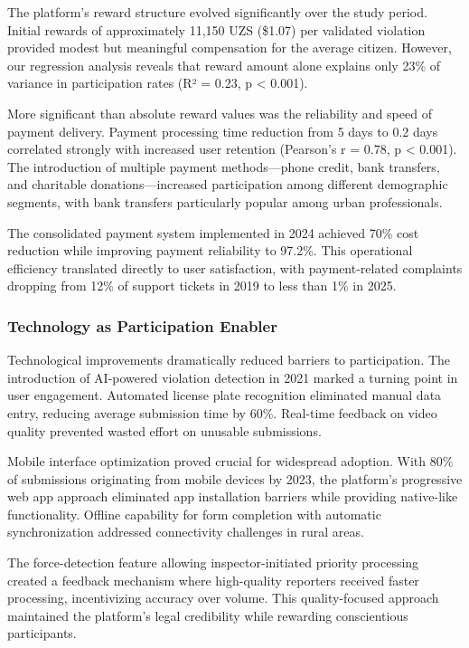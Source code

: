\documentclass[pdflatex,sn-mathphys-num]{sn-jnl}%
\theoremstyle{thmstyleone}%
\theoremstyle{thmstyletwo}%
\theoremstyle{thmstylethree}%
\begin{document}
The platform's reward structure evolved significantly over the study period. Initial rewards of approximately 11,150 UZS (\$1.07) per validated violation provided modest but meaningful compensation for the average citizen. However, our regression analysis reveals that reward amount alone explains only 23\% of variance in participation rates (R² = 0.23, p < 0.001).

More significant than absolute reward values was the reliability and speed of payment delivery. Payment processing time reduction from 5 days to 0.2 days correlated strongly with increased user retention (Pearson's r = 0.78, p < 0.001). The introduction of multiple payment methods—phone credit, bank transfers, and charitable donations—increased participation among different demographic segments, with bank transfers particularly popular among urban professionals.

The consolidated payment system implemented in 2024 achieved 70\% cost reduction while improving payment reliability to 97.2\%. This operational efficiency translated directly to user satisfaction, with payment-related complaints dropping from 12\% of support tickets in 2019 to less than 1\% in 2025.

\subsubsection{Technology as Participation Enabler}

Technological improvements dramatically reduced barriers to participation. The introduction of AI-powered violation detection in 2021 marked a turning point in user engagement. Automated license plate recognition eliminated manual data entry, reducing average submission time by 60\%. Real-time feedback on video quality prevented wasted effort on unusable submissions.

Mobile interface optimization proved crucial for widespread adoption. With 80\% of submissions originating from mobile devices by 2023, the platform's progressive web app approach eliminated app installation barriers while providing native-like functionality. Offline capability for form completion with automatic synchronization addressed connectivity challenges in rural areas.

The force-detection feature allowing inspector-initiated priority processing created a feedback mechanism where high-quality reporters received faster processing, incentivizing accuracy over volume. This quality-focused approach maintained the platform's legal credibility while rewarding conscientious participants.
\end{document}
